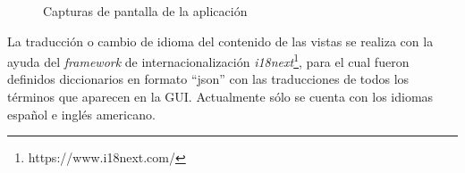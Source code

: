 \begin{figure}[ht]
    \hfill
    \hfill
    \hfill
    \hfill
    \caption{Capturas de pantalla de la aplicación} \label{fig:capturas}
\end{figure}

La traducción o cambio de idioma del contenido de las vistas se realiza con la ayuda del \textit{framework} de internacionalización \textit{i18next}\footnote{https://www.i18next.com/}, para el cual fueron definidos diccionarios en formato ``json'' con las traducciones de todos los términos que aparecen en la GUI. Actualmente sólo se cuenta con los idiomas español e inglés americano.

